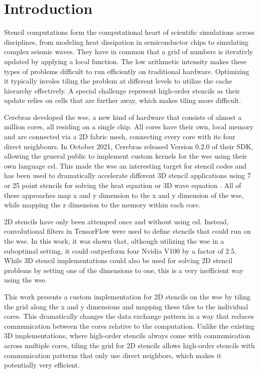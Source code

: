 \chapter{Introduction}
Stencil computations form the computational heart of scientific simulations across disciplines, from modeling heat dissipation in semiconductor chips to simulating complex seismic waves.
They have in common that a grid of numbers is iterativly updated by applying a local function.
The low arithmetic intensity makes these types of problems difficult to run efficiently on traditional hardware.
Optimizing it typically involes tiling the problem at different levels to utilize the cache hierarchy effectively.
A special challenge represent high-order stencils as their update relies on cells that are further away, which makes tiling more difficult.

Cerebras developed the \ac{wse}, a new kind of hardware that consists of almost a million cores, all residing on a single chip.
All cores have their own, local memory and are connected via a 2D fabric mesh, connecting every core with its four direct neighbours.
In October 2021, Cerebras released Version 0.2.0 of their SDK, allowing the general public to implement custom kernels for the \ac{wse} using their own language \ac{csl}. 
This made the \ac{wse} an interesting target for stencil codes and has been used to dramatically accelerate different 3D stencil applications using 7 or 25 point stencils for solving the heat equation or 3D wave equation \cite{jacquelin2022scalable,rocki2020fast,woo2022disruptive,sai2024matrix}.
All of these approaches map x and y dimension to the x and y dimension of the \ac{wse}, while mapping the z dimension to the memory within each core.

2D stencils have only been attemped once and without using \ac{csl}. Instead, convolutional filters in TensorFlow were used to define stencils that could run on the \ac{wse}\cite{brown2022tensorflow}. In this work, it was shown that, although utilizing the \ac{wse} in a suboptimal setting, it could outperform four Nvidia V100 by a factor of 2.5. While 3D stencil implementations could also be used for solving 2D stencil problems by setting one of the dimensions to one, this is a very inefficient way using the \ac{wse}.

This work presents a custom implementation for 2D stencils on the \ac{wse} by tiling the grid along the x and y dimensions and mapping these tiles to the individual cores.
This dramatically changes the data exchange pattern in a way that reduces communication between the cores relative to the computation.
Unlike the existing 3D implementations, where high-order stencils always come with communication across multiple cores, tiling the grid for 2D stencils allows high-order stencils with communication patterns that only use direct neighbors, which makes it potentially very efficient.

